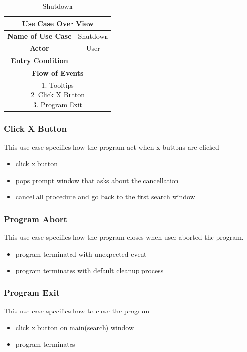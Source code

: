 \documentclass[conference]{IEEEtran}
\begin{document}
\begin{table}[hbt]
\renewcommand{\arraystretch}{1}
\caption{Shutdown}
\label{table:usecase4}
\centering
\begin{adjustbox}{width=0.3\textwidth}
\small
\begin{tabular}{c|c}
\hline
\multicolumn{2}{c}{\textbf{Use Case Over View}} \\
\hline
\textbf{Name of Use Case} & Shutdown\\
\hline
\textbf{Actor} & User \\
\hline
\textbf{Entry Condition} & \\
\hline
\multicolumn{2}{c}{\textbf{Flow of Events}}\\
\hline
\multicolumn{2}{c}{
\parbox[t]{5cm}{
  1. Tooltips \\
  2. Click X Button \\
  3. Program Exit
  }
}\\
\hline

\end{tabular}
\end{adjustbox}
\end{table}


\subsubsection{Click X Button}
This use case specifies how the program act when x buttons are clicked
\begin{itemize}
  \item click x button
  \item pops prompt window that asks about the cancellation
  \item cancel all procedure and go back to the first search window
\end{itemize}
\textit{}

\subsubsection{Program Abort}
This use case specifies how the program closes when user aborted the program.
\begin{itemize}
  \item program terminated with unexpected event
  \item program terminates with default cleanup process
\end{itemize}

\subsubsection{Program Exit}
This use case specifies how to close the program.
\begin{itemize}
  \item click x button on main(search) window
  \item program terminates
\end{itemize}
\textit{}
\end{document}
